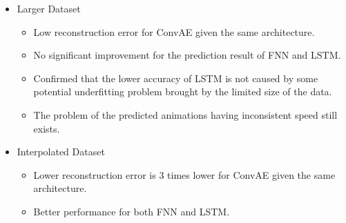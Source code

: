 {\begin{itemize}
\begin{itemize}
            \begin{itemize}
                \item output-as-input prediction fails to capture the trend of simulation in its worst case and the prediction result is completely different to the actual simulations.

                \item while the second method mostly matches with the actual output even in its worst case.

            \end{itemize}

            \item LSTM has a higher loss value than FNN, but is able to capture the characteristic of the simulation more precisely.

            \item predicted animations generated by FNN and LSTM are either moving faster or slower than the actual simulations.

        \end{itemize}

    \item Larger Dataset
        \begin{itemize}
            \item Low reconstruction error for ConvAE given the same architecture.

            \item No significant improvement for the prediction result of FNN and LSTM.

            \item Confirmed that the lower accuracy of LSTM is not caused by some potential underfitting problem brought by the limited size of the data.

            \item The problem of the predicted animations having inconsistent speed still exists.

        \end{itemize}


    \item Interpolated Dataset

    \begin{itemize}
            \item Lower reconstruction error is 3 times lower for ConvAE given the same architecture.

            \item Better performance for both FNN and LSTM.


\end{itemize}
\end{itemize}}
